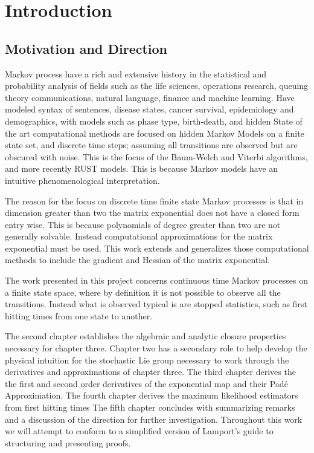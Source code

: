 \chapter{Introduction}
\section{Motivation and Direction}
Markov process have a rich and extensive history in the statistical and 
probability analysis of fields such as the life sciences, operations research,
queuing theory communications, natural language, finance and machine learning.
Have modeled syntax of sentences, disease states, cancer survival, epidemiology
and demographics, with models such as phase type, birth-death, and hidden
State of the art computational methods are focused on hidden Markov Models on
a finite state set, and discrete time steps; assuming all transitions are
observed but are obscured with noise. This is the focus of the Baum-Welch and
Viterbi algorithms, and more recently RUST models. This is because Markov models
have an intuitive phenomenological interpretation.

The reason for the focus on discrete time finite state Markov processes is that
in dimension greater than two the matrix exponential does not have a closed form
entry wise. This is because polynomials of degree greater than two are not
generally solvable. Instead computational approximations for the matrix
exponential must be used. This work extends and generalizes those computational
methods to include the gradient and Hessian of the matrix exponential.

The work presented in this project concerns continuous time Markov processes on
a finite state space, where by definition it is not possible to observe all the
transitions. Instead what is observed typical is are stopped statistics, such
as first hitting times from one state to another.

The second chapter establishes the algebraic and analytic closure properties
necessary for chapter three. Chapter two has a secondary role to help develop the 
physical intuition for the stochastic Lie group necessary to work through the 
derivatives and approximations of chapter three.
The third chapter derives the the first and second order derivatives of the exponential
map and their Pad\'{e} Approximation.
The fourth chapter derives the maximum likelihood estimators from first hitting times
The fifth chapter concludes with summarizing remarks and a discussion of the direction
for further investigation.
Throughout this work we will attempt to conform to a simplified version of 
Lamport's guide to structuring and presenting proofs.

